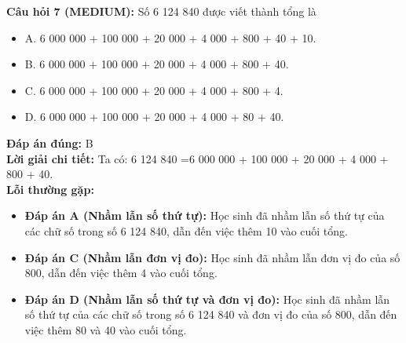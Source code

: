 \documentclass{article}
\begin{document}
\begin{minipage}{\textwidth}
\noindent\textbf{Câu hỏi 7 (MEDIUM):} Số 6 124 840 được viết thành tổng là 
\begin{itemize}[label={}]
    \item A. 6 000 000 + 100 000 + 20 000 + 4 000 + 800 + 40 + 10.
    \item B. 6 000 000 + 100 000 + 20 000 + 4 000 + 800 + 40.
    \item C. 6 000 000 + 100 000 + 20 000 + 4 000 + 800 + 4.
    \item D. 6 000 000 + 100 000 + 20 000 + 4 000 + 80 + 40.
\end{itemize}
\textbf{Đáp án đúng:} B \\
\textbf{Lời giải chi tiết:} Ta có: 6 124 840 =6 000 000 + 100 000 + 20 000 + 4 000 + 800 + 40. \\
\textbf{Lỗi thường gặp:}
\begin{itemize}
  \item \textbf{Đáp án A (Nhầm lẫn số thứ tự):} Học sinh đã nhầm lẫn số thứ tự của các chữ số trong số 6 124 840, dẫn đến việc thêm 10 vào cuối tổng.
  \item \textbf{Đáp án C (Nhầm lẫn đơn vị đo):} Học sinh đã nhầm lẫn đơn vị đo của số 800, dẫn đến việc thêm 4 vào cuối tổng.
  \item \textbf{Đáp án D (Nhầm lẫn số thứ tự và đơn vị đo):} Học sinh đã nhầm lẫn số thứ tự của các chữ số trong số 6 124 840 và đơn vị đo của số 800, dẫn đến việc thêm 80 và 40 vào cuối tổng.
\end{itemize}
\end{minipage}
\vspace{1em}
\end{document}
